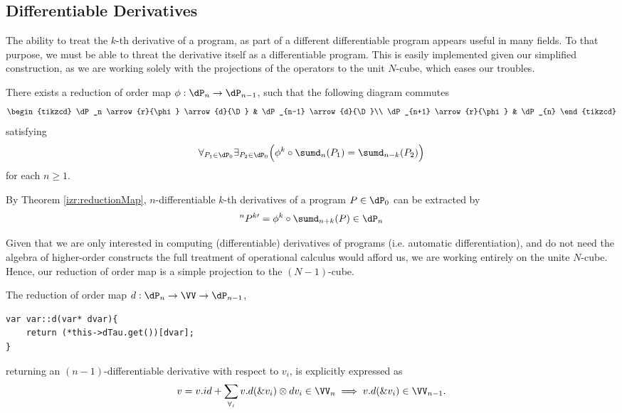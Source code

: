 \subsection{Differentiable Derivatives}\label{sec:orderReduction}
 
The ability to treat the $k$-th derivative of a program, as part of a different differentiable program appears useful in many fields. To that purpose, we must be able to threat the derivative itself as a differentiable program. This is easily implemented given our simplified construction, as we are working solely with the projections of the operators to the unit $N$-cube, which eases our troubles.

\begin{izrek}\label{izr:reductionMap}
There exists a reduction of order map $\phi:\dP_n\to \dP_{n-1}$, such that the
following  diagram commutes
\begin{equation}\label{eq:reductionMap}
\begin{tikzcd}
  \dP_n \arrow{r}{\phi} \arrow{d}{\D} & 
  \dP_{n-1} \arrow{d}{\D}\\
  \dP_{n+1} \arrow{r}{\phi} & 
  \dP_{n}
\end{tikzcd}
\end{equation}
satisfying
\begin{equation}
\forall_{P_1\in\dP_0}\exists_{P_2\in\dP_0}\Big(\phi^k\circ \sumd_n(P_1)=\sumd_{n-k}(P_2)\Big)
\end{equation}
for each $n\ge 1$.
\end{izrek}  
\begin{corollary}\label{cor:extraxtDerivatives}
By Theorem \ref{izr:reductionMap}, $n$-differentiable $k$-th derivatives of a program $P\in\dP_0$ can be extracted by
\begin{equation}
^{n}P^{k\prime}=\phi^k\circ \sumd_{n+k}(P)\in\dP_n
\end{equation}
\end{corollary}

Given that we are only interested in computing (differentiable) derivatives of programs (i.e. automatic differentiation), and do not need the algebra of higher-order constructs the full treatment of operational calculus would afford us, we are working entirely on the unite $N$-cube. Hence, our reduction of order map is a simple projection to the $(N-1)$-cube.

The reduction of order map $d:\dP_n\to\VV\to\dP_{n-1}$,
\begin{lstlisting}
var var::d(var* dvar){
    return (*this->dTau.get())[dvar];
}
\end{lstlisting}
returning an $(n-1)$-differentiable derivative with respect to $v_i$, is explicitly expressed as
\begin{equation}
v=v.id+\sum\limits_{\forall_i}v.d(\&v_i)\otimes dv_i \in\VV_n\implies v.d(\&v_i)\in\VV_{n-1}.
\end{equation}

